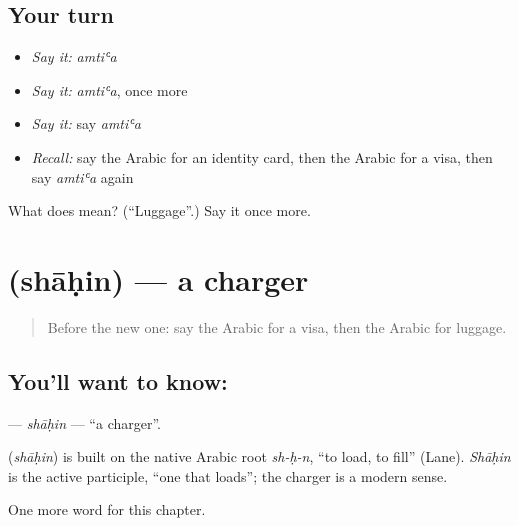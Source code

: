 \subsection*{Your turn}
\begin{itemize}
\raggedright
  \item \emph{Say it:} \emph{amtiʿa}
  \item \emph{Say it:} \emph{amtiʿa}, once more
  \item \emph{Say it:} say \emph{amtiʿa}
  \item \emph{Recall:} say the Arabic for an identity card, then the Arabic for a visa, then say \emph{amtiʿa} again
\end{itemize}

\begin{tcolorbox}[breakable,colback=teal!4,colframe=teal!35!black,title={Before you move on}]
What does  mean? (\textquotedblleft{}Luggage\textquotedblright{}.) Say it once more.
\end{tcolorbox}
\section[\texorpdfstring{\ar{شاحن} (shāḥin)}{شاحن (shāḥin)}]{ (shāḥin) — a charger}

\label{lesson:AR-C215-shahin}



\begin{quote}
Before the new one: say the Arabic for a visa, then the Arabic for luggage.
\end{quote}

\subsection*{You'll want to know: }
\textbf{} — \emph{shāḥin} — \textquotedblleft{}a charger\textquotedblright{}.

\begin{cousinweb}
\textbf{} (\emph{shāḥin}) is built on the native Arabic root \emph{sh-ḥ-n}, \textquotedblleft{}to load, to fill\textquotedblright{} (Lane). \emph{Shāḥin} is the active participle, \textquotedblleft{}one that loads\textquotedblright{}; the charger is a modern sense.
\end{cousinweb}

\begin{grammarlens}[title={What you've built}]
One more word for this chapter.
\end{grammarlens}


